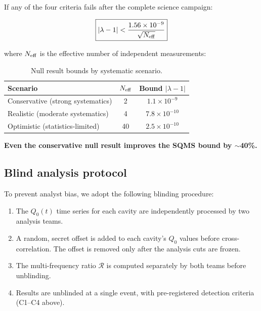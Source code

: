 \documentclass[11pt]{article}
\newcommand{\lbone}{|\lambda - 1|}
\newcommand{\ee}[1]{\times 10^{#1}}
\begin{document}
If any of the four criteria fails after the complete science campaign:

\begin{equation}
\boxed{
\lbone < \frac{1.56\ee{-9}}{\sqrt{N_{\rm eff}}}
}
\end{equation}

where $N_{\rm eff}$ is the effective number of independent measurements:

\begin{table}[H]
\centering
\caption{Null result bounds by systematic scenario.}
\label{tab:null_bounds}
\renewcommand{\arraystretch}{1.2}
\begin{tabular}{@{}lcc@{}}
\toprule
\textbf{Scenario} & $N_{\rm eff}$ & \textbf{Bound $\lbone$} \\
\midrule
Conservative (strong systematics) & 2 & $1.1\ee{-9}$ \\
Realistic (moderate systematics) & 4 & $7.8\ee{-10}$ \\
Optimistic (statistics-limited) & 40 & $2.5\ee{-10}$ \\
\bottomrule
\end{tabular}
\end{table}

\textbf{Even the conservative null result improves the SQMS bound by
$\sim$40\%.}

\subsection{Blind analysis protocol}

To prevent analyst bias, we adopt the following blinding procedure:
\begin{enumerate}[nosep]
\item The $Q_0(t)$ time series for each cavity are independently
  processed by two analysis teams.
\item A random, secret offset is added to each cavity's $Q_0$ values
  before cross-correlation. The offset is removed only after the
  analysis cuts are frozen.
\item The multi-frequency ratio $\mathcal{R}$ is computed separately by
  both teams before unblinding.
\item Results are unblinded at a single event, with pre-registered
  detection criteria (C1--C4 above).
\end{enumerate}


\end{document}

